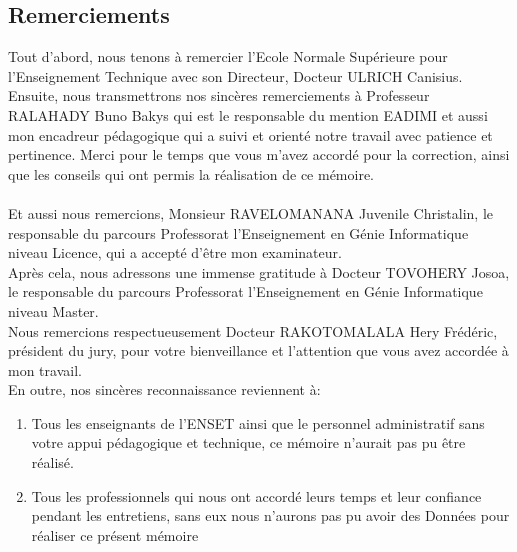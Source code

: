 \documentclass[a4paper,oneside,12pt]{book}
\renewcommand{\tablename}{\textrm{Tableau}}
\begin{document}
	\renewcommand{\tablename}{Tableau}
	\renewcommand{\listfigurename}{Liste des figures}
\pagestyle{empty}

\newpage
\null
\newpage

\pagestyle{plain}
\pagestyle{fancy}

	\begin{center}
		\item \chapter*{Remerciements}
	\end{center}


Tout d'abord, nous tenons à remercier l’Ecole Normale Supérieure pour l’Enseignement Technique avec son Directeur, Docteur ULRICH Canisius.     \\

Ensuite, nous transmettrons nos sincères remerciements à Professeur RALAHADY Buno Bakys qui est le responsable du mention EADIMI et aussi  mon encadreur pédagogique qui a suivi et orienté notre travail avec patience et pertinence. Merci pour le temps que vous m’avez accordé pour la correction, ainsi que les conseils qui ont permis la réalisation de ce mémoire.   \\ 
     \\

Et aussi nous remercions, Monsieur RAVELOMANANA Juvenile Christalin, le responsable du parcours Professorat l’Enseignement en Génie Informatique niveau Licence, qui a accepté d'\^{e}tre mon examinateur.\\

Après cela, nous adressons une immense gratitude à Docteur TOVOHERY Josoa, le responsable du parcours Professorat l’Enseignement en Génie Informatique niveau Master.\\
 
Nous remercions respectueusement Docteur RAKOTOMALALA Hery Frédéric, président du jury, pour votre bienveillance et l'attention que vous avez accordée à mon travail.  \\
 
En outre, nos sincères reconnaissance reviennent à: 
\begin{enumerate}
	\item[-] Tous les enseignants de l’ENSET ainsi que le personnel administratif sans votre appui pédagogique et technique, ce mémoire n’aurait pas pu être réalisé.
	\item[-] Tous les professionnels qui nous ont accordé leurs temps et leur confiance pendant les entretiens, sans eux nous n’aurons pas pu avoir des Données pour réaliser ce présent mémoire
\end{enumerate}	
\end{document}

